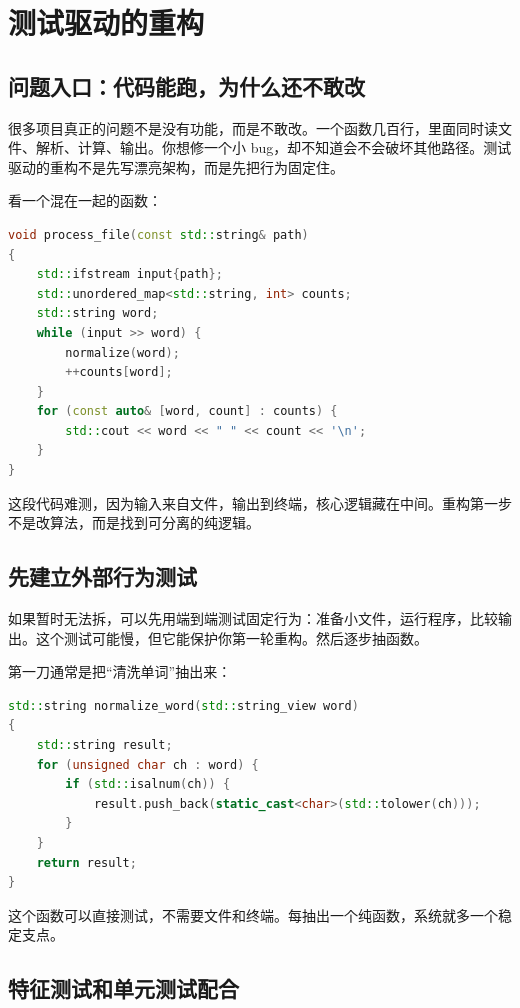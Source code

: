 \chapter{测试驱动的重构}

\section{问题入口：代码能跑，为什么还不敢改}

很多项目真正的问题不是没有功能，而是不敢改。一个函数几百行，里面同时读文件、解析、计算、输出。你想修一个小 bug，却不知道会不会破坏其他路径。测试驱动的重构不是先写漂亮架构，而是先把行为固定住。

看一个混在一起的函数：

\begin{lstlisting}[language=C++,caption={难以测试的混合函数}]
void process_file(const std::string& path)
{
    std::ifstream input{path};
    std::unordered_map<std::string, int> counts;
    std::string word;
    while (input >> word) {
        normalize(word);
        ++counts[word];
    }
    for (const auto& [word, count] : counts) {
        std::cout << word << " " << count << '\n';
    }
}
\end{lstlisting}

这段代码难测，因为输入来自文件，输出到终端，核心逻辑藏在中间。重构第一步不是改算法，而是找到可分离的纯逻辑。

\section{先建立外部行为测试}

如果暂时无法拆，可以先用端到端测试固定行为：准备小文件，运行程序，比较输出。这个测试可能慢，但它能保护你第一轮重构。然后逐步抽函数。

第一刀通常是把“清洗单词”抽出来：

\begin{lstlisting}[language=C++,caption={先抽纯函数}]
std::string normalize_word(std::string_view word)
{
    std::string result;
    for (unsigned char ch : word) {
        if (std::isalnum(ch)) {
            result.push_back(static_cast<char>(std::tolower(ch)));
        }
    }
    return result;
}
\end{lstlisting}

这个函数可以直接测试，不需要文件和终端。每抽出一个纯函数，系统就多一个稳定支点。

\section{特征测试和单元测试配合}


